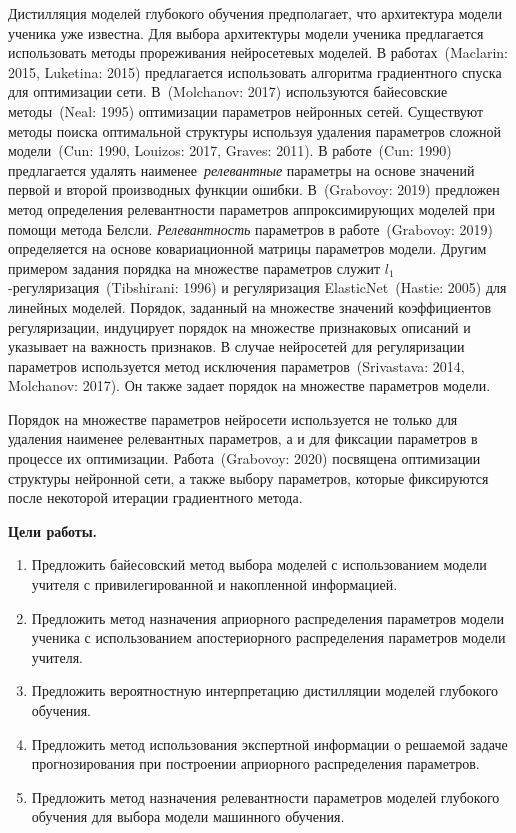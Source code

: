 \documentclass{dissert}
\begin{document}
Дистилляция моделей глубокого обучения предполагает, что архитектура модели ученика уже известна. Для выбора архитектуры модели ученика предлагается использовать методы прореживания нейросетевых моделей. В работах~(Maclarin: 2015, Luketina: 2015) предлагается использовать алгоритма градиентного спуска для оптимизации сети. В~(Molchanov: 2017) используются байесовские методы~(Neal: 1995) оптимизации параметров нейронных сетей. Существуют методы поиска оптимальной структуры используя удаления параметров сложной модели~(Cun: 1990, Louizos: 2017, Graves: 2011). В работе~(Cun: 1990) предлагается удалять наименее~\textit{релевантные} параметры на основе значений первой и второй производных функции ошибки. В~(Grabovoy: 2019) предложен метод определения релевантности параметров аппроксимирующих моделей при помощи метода Белсли. \textit{Релевантность} параметров в работе~(Grabovoy: 2019) определяется на основе ковариационной матрицы параметров модели.
Другим примером задания порядка на множестве параметров служит $l_1$-регуляризация~(Tibshirani: 1996) и регуляризация ElasticNet~(Hastie: 2005) для линейных моделей.
Порядок, заданный на множестве значений коэффициентов регуляризации, индуцирует порядок на множестве признаковых описаний и указывает на важность признаков.
В случае нейросетей для регуляризации параметров используется метод исключения параметров~(Srivastava: 2014, Molchanov: 2017).
Он также задает порядок на множестве параметров модели.

Порядок на множестве параметров нейросети используется не только для удаления наименее релевантных параметров, а и для фиксации параметров в процессе их оптимизации. Работа~(Grabovoy: 2020) посвящена оптимизации структуры нейронной сети, а также выбору параметров, которые фиксируются после некоторой итерации градиентного метода. 


\vspace{0.5cm}
\textbf{Цели работы.}
\vspace{0.2cm}
\begin{enumerate}
\item Предложить байесовский метод выбора моделей с использованием модели учителя с привилегированной и накопленной информацией.
\item Предложить метод назначения априорного распределения параметров модели ученика с использованием апостериорного распределения параметров модели учителя.
\item Предложить вероятностную интерпретацию дистилляции моделей глубокого обучения.
\item Предложить метод использования экспертной информации о решаемой задаче прогнозирования при построении априорного распределения параметров.
\item Предложить метод назначения релевантности параметров моделей глубокого обучения для выбора модели машинного обучения.
\end{enumerate}
\end{document}
